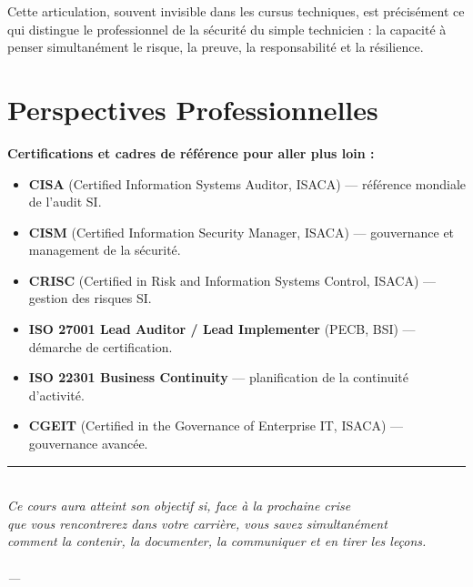 Cette articulation, souvent invisible dans les cursus techniques, est précisément ce qui distingue le professionnel de la sécurité du simple technicien : la capacité à penser simultanément le risque, la preuve, la responsabilité et la résilience.

\section*{Perspectives Professionnelles}

\begin{boxinfo}
\textbf{Certifications et cadres de référence pour aller plus loin :}
\begin{itemize}
    \item \textbf{CISA} (Certified Information Systems Auditor, ISACA) — référence mondiale de l'audit SI.
    \item \textbf{CISM} (Certified Information Security Manager, ISACA) — gouvernance et management de la sécurité.
    \item \textbf{CRISC} (Certified in Risk and Information Systems Control, ISACA) — gestion des risques SI.
    \item \textbf{ISO 27001 Lead Auditor / Lead Implementer} (PECB, BSI) — démarche de certification.
    \item \textbf{ISO 22301 Business Continuity} — planification de la continuité d'activité.
    \item \textbf{CGEIT} (Certified in the Governance of Enterprise IT, ISACA) — gouvernance avancée.
\end{itemize}
\end{boxinfo}

\vspace{2ex}
\begin{center}
    {\color{CouleurAccent}\rule{0.6\linewidth}{1pt}}\\[0.8ex]
    {\small\itshape\color{CouleurPrimaire}
        Ce cours aura atteint son objectif si, face à la prochaine crise\\
        que vous rencontrerez dans votre carrière, vous savez simultanément\\
        comment la contenir, la documenter, la communiquer et en tirer les leçons.}\\[0.5ex]
    {\small\bfseries\color{CouleurPrimaire}\auteurcours}\\
    {\footnotesize\color{CouleurBordInfo}\itshape\institutionprimaire{} --- \anneescolaire}
\end{center}
